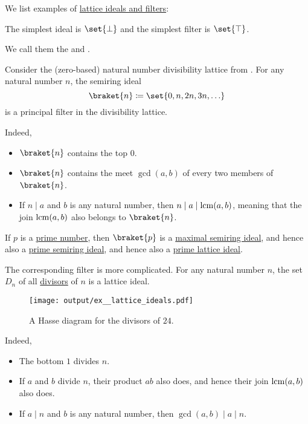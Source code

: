 \begin{example}\label{ex:def:lattice_ideal}
  We list examples of \hyperref[def:lattice_ideal]{lattice ideals and filters}:
  \begin{thmenum}
     The simplest ideal is \( \set{ \bot } \) and the simplest filter is \( \set{ \top } \).

    We call them the  and .

     Consider the (zero-based) natural number divisibility lattice from . For any natural number \( n \), the semiring ideal
    \begin{equation*}
      \braket{ n } \coloneqq \set{ 0, n, 2n, 3n, \ldots }
    \end{equation*}
    is a principal filter in the divisibility lattice.

    Indeed,
    \begin{itemize}
      \item \( \braket{ n } \) contains the top \( 0 \).
      \item \( \braket{ n } \) contains the meet \( \gcd(a, b) \) of every two members of \( \braket{ n } \).
      \item If \( n \mid a \) and \( b \) is any natural number, then \( n \mid a \mid \operatorname{lcm}(a, b) \), meaning that the join \( \operatorname{lcm}(a, b) \) also belongs to \( \braket{ n } \).
    \end{itemize}

    If \( p \) is a \hyperref[def:prime_number]{prime number}, then \( \braket{ p } \) is a \hyperref[def:semiring_ideal/maximal]{maximal semiring ideal}, and hence also a \hyperref[def:semiring_ideal/prime]{prime semiring ideal}, and hence also a \hyperref[def:lattice_ideal/prime]{prime lattice ideal}.

    The corresponding filter is more complicated. For any natural number \( n \), the set \( D_n \) of all \hyperref[def:divisibility]{divisors} of \( n \) is a lattice ideal.

    \begin{figure}[!ht]
      \centering
      \texttt{[image: output/ex\_\_lattice\_ideals.pdf]}
      \caption{A Hasse diagram for the divisors of \( 24 \).}
      \label{fig:ex:def:lattice_ideal/lattice}
    \end{figure}

    Indeed,
    \begin{itemize}
      \item The bottom \( 1 \) divides \( n \).
      \item If \( a \) and \( b \) divide \( n \), their product \( ab \) also does, and hence their join \( \operatorname{lcm}(a, b) \) also does.
      \item If \( a \mid n \) and \( b \) is any natural number, then \( \gcd(a, b) \mid a \mid n \).
    \end{itemize}


\end{thmenum}
\end{example}
